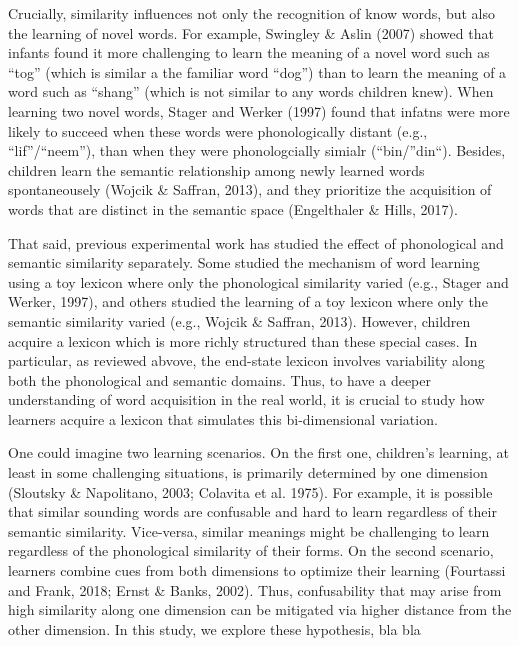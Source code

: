 \documentclass[10pt, letterpaper]{article}
\begin{document}
Crucially, similarity influences not only the recognition of know words,
but also the learning of novel words. For example, Swingley \& Aslin
(2007) showed that infants found it more challenging to learn the
meaning of a novel word such as ``tog'' (which is similar a the familiar
word ``dog'') than to learn the meaning of a word such as ``shang''
(which is not similar to any words children knew). When learning two
novel words, Stager and Werker (1997) found that infatns were more
likely to succeed when these words were phonologically distant (e.g.,
``lif''/``neem''), than when they were phonologcially simialr
(``bin/''din``). Besides, children learn the semantic relationship among
newly learned words spontaneousely (Wojcik \& Saffran, 2013), and they
prioritize the acquisition of words that are distinct in the semantic
space (Engelthaler \& Hills, 2017).

That said, previous experimental work has studied the effect of
phonological and semantic similarity separately. Some studied the
mechanism of word learning using a toy lexicon where only the
phonological similarity varied (e.g., Stager and Werker, 1997), and
others studied the learning of a toy lexicon where only the semantic
similarity varied (e.g., Wojcik \& Saffran, 2013). However, children
acquire a lexicon which is more richly structured than these special
cases. In particular, as reviewed abvove, the end-state lexicon involves
variability along both the phonological and semantic domains. Thus, to
have a deeper understanding of word acquisition in the real world, it is
crucial to study how learners acquire a lexicon that simulates this
bi-dimensional variation.

One could imagine two learning scenarios. On the first one, children's
learning, at least in some challenging situations, is primarily
determined by one dimension (Sloutsky \& Napolitano, 2003; Colavita et
al. 1975). For example, it is possible that similar sounding words are
confusable and hard to learn regardless of their semantic similarity.
Vice-versa, similar meanings might be challenging to learn regardless of
the phonological similarity of their forms. On the second scenario,
learners combine cues from both dimensions to optimize their learning
(Fourtassi and Frank, 2018; Ernst \& Banks, 2002). Thus, confusability
that may arise from high similarity along one dimension can be mitigated
via higher distance from the other dimension. In this study, we explore
these hypothesis, bla bla
\end{document}
